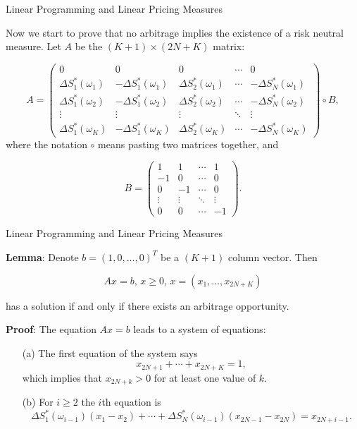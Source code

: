 \documentclass{beamer}
\begin{document}
\begin{frame}{Linear Programming and Linear Pricing Measures}

    {\footnotesize \footnotesize
     Now we start to prove that no arbitrage implies the existence of a risk neutral measure. Let $A$ be the $(K + 1) \times (2N + K)$ matrix:

    \[
    A = 
    \begin{pmatrix}
    0 & 0 & 0 & \cdots & 0 \\
    \Delta S^*_1(\omega_1) & -\Delta S^*_1(\omega_1) & \Delta S^*_2(\omega_1) & \cdots & -\Delta S^*_N(\omega_1) \\
    \Delta S^*_1(\omega_2) & -\Delta S^*_1(\omega_2) & \Delta S^*_2(\omega_2) & \cdots & -\Delta S^*_N(\omega_2) \\
    \vdots & \vdots & \vdots & \ddots & \vdots \\
    \Delta S^*_1(\omega_K) & -\Delta S^*_1(\omega_K) & \Delta S^*_2(\omega_K) & \cdots & -\Delta S^*_N(\omega_K)
    \end{pmatrix} \circ B,
    \]
    where the notation $\circ$ means pasting two matrices together, and

    \[
    B = \begin{pmatrix}
    1 & 1 & \cdots & 1 \\
    -1 & 0 & \cdots & 0 \\
    0 & -1 & \cdots & 0 \\
    \vdots & \vdots & \ddots & \vdots \\
    0 & 0 & \cdots & -1
    \end{pmatrix}.
    \]

    }
\end{frame}

\begin{frame}{Linear Programming and Linear Pricing Measures}

    {\footnotesize \footnotesize
    
    \par \textbf{Lemma}: Denote $b = (1, 0, \ldots, 0)^T$ be a $(K + 1)$ column vector. Then

\[
Ax = b, \, x \geq 0, \, x = (x_1, \ldots, x_{2N+K})
\]

has a solution if and only if there exists an arbitrage opportunity.
\vspace{1em}
\par \textbf{Proof}:
The equation $Ax = b$ leads to a system of equations:

\begin{enumerate}
\item[(a)] The first equation of the system says
\[
x_{2N+1} + \cdots + x_{2N+K} = 1,
\]
which implies that $x_{2N+k} > 0$ for at least one value of $k$.

\item[(b)] For $i \geq 2$ the $i$th equation is
\[
\Delta S_1^*(\omega_{i-1})(x_1 - x_2) + \cdots + \Delta S_N^*(\omega_{i-1})(x_{2N-1} - x_{2N}) = x_{2N+i-1}.
\]
\end{enumerate}
    }
\end{frame}




    
\end{document}
